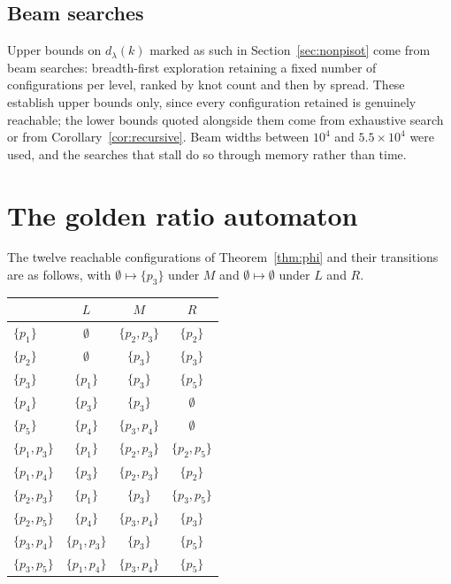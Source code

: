 \documentclass[11pt,reqno]{amsart}
\theoremstyle{plain}
\theoremstyle{definition}
\theoremstyle{remark}
\begin{document}
\subsection{Beam searches}
Upper bounds on $d_\lambda(k)$ marked as such in Section~\ref{sec:nonpisot}
come from beam searches: breadth-first exploration retaining a fixed number of
configurations per level, ranked by knot count and then by spread. These
establish upper bounds only, since every configuration retained is genuinely
reachable; the lower bounds quoted alongside them come from exhaustive search
or from Corollary~\ref{cor:recursive}. Beam widths between $10^4$ and
$5.5\times10^4$ were used, and the searches that stall do so through memory
rather than time.

\section{The golden ratio automaton}\label{app:phi}

The twelve reachable configurations of Theorem~\ref{thm:phi} and their
transitions are as follows, with $\emptyset\mapsto\{p_3\}$ under $M$ and
$\emptyset\mapsto\emptyset$ under $L$ and $R$.

\begin{center}
\begin{tabular}{lccc}
\toprule
 & $L$ & $M$ & $R$\\
\midrule
$\{p_1\}$ & $\emptyset$ & $\{p_2,p_3\}$ & $\{p_2\}$\\
$\{p_2\}$ & $\emptyset$ & $\{p_3\}$ & $\{p_3\}$\\
$\{p_3\}$ & $\{p_1\}$ & $\{p_3\}$ & $\{p_5\}$\\
$\{p_4\}$ & $\{p_3\}$ & $\{p_3\}$ & $\emptyset$\\
$\{p_5\}$ & $\{p_4\}$ & $\{p_3,p_4\}$ & $\emptyset$\\
$\{p_1,p_3\}$ & $\{p_1\}$ & $\{p_2,p_3\}$ & $\{p_2,p_5\}$\\
$\{p_1,p_4\}$ & $\{p_3\}$ & $\{p_2,p_3\}$ & $\{p_2\}$\\
$\{p_2,p_3\}$ & $\{p_1\}$ & $\{p_3\}$ & $\{p_3,p_5\}$\\
$\{p_2,p_5\}$ & $\{p_4\}$ & $\{p_3,p_4\}$ & $\{p_3\}$\\
$\{p_3,p_4\}$ & $\{p_1,p_3\}$ & $\{p_3\}$ & $\{p_5\}$\\
$\{p_3,p_5\}$ & $\{p_1,p_4\}$ & $\{p_3,p_4\}$ & $\{p_5\}$\\
\bottomrule
\end{tabular}
\end{center}
\end{document}
